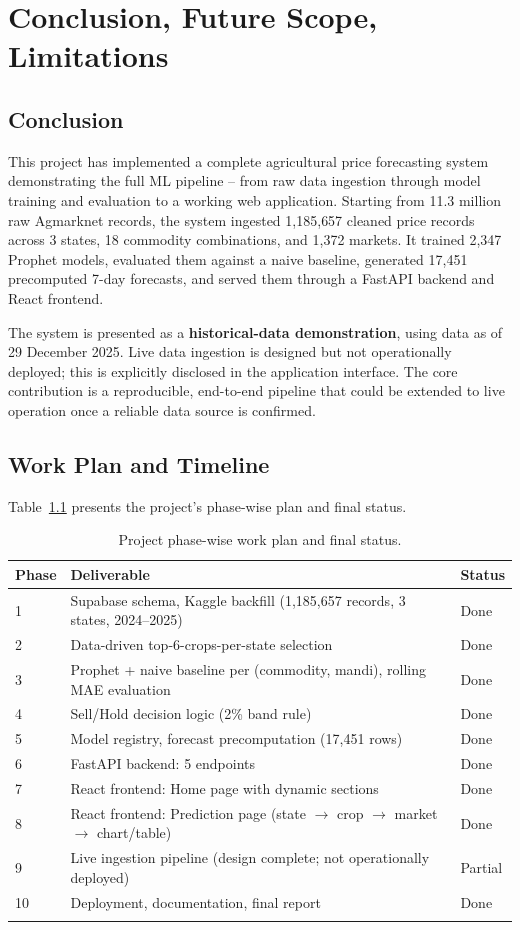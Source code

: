 \chapter{Conclusion, Future Scope, Limitations}

\section{Conclusion}
This project has implemented a complete agricultural price forecasting
system demonstrating the full ML pipeline -- from raw data ingestion
through model training and evaluation to a working web application.
Starting from 11.3 million raw Agmarknet records, the system ingested
1{,}185{,}657 cleaned price records across 3 states, 18 commodity
combinations, and 1{,}372 markets. It trained 2{,}347 Prophet models,
evaluated them against a naive baseline, generated 17{,}451 precomputed
7-day forecasts, and served them through a FastAPI backend and React
frontend.

The system is presented as a \textbf{historical-data demonstration},
using data as of 29 December 2025. Live data ingestion is designed but
not operationally deployed; this is explicitly disclosed in the
application interface. The core contribution is a reproducible,
end-to-end pipeline that could be extended to live operation once a
reliable data source is confirmed.

\section{Work Plan and Timeline}
Table~\ref{tab:timeline} presents the project's phase-wise plan and
final status.

\begin{longtable}{@{}p{1.2cm}p{7.5cm}p{3cm}@{}}
\toprule
\textbf{Phase} & \textbf{Deliverable} & \textbf{Status} \\
\midrule
\endhead
1 & Supabase schema, Kaggle backfill (1{,}185{,}657 records, 3 states, 2024--2025) & Done \\
2 & Data-driven top-6-crops-per-state selection & Done \\
3 & Prophet + naive baseline per (commodity, mandi), rolling MAE evaluation & Done \\
4 & Sell/Hold decision logic (2\% band rule) & Done \\
5 & Model registry, forecast precomputation (17{,}451 rows) & Done \\
6 & FastAPI backend: 5 endpoints & Done \\
7 & React frontend: Home page with dynamic sections & Done \\
8 & React frontend: Prediction page (state $\to$ crop $\to$ market $\to$ chart/table) & Done \\
9 & Live ingestion pipeline (design complete; not operationally deployed) & Partial \\
10 & Deployment, documentation, final report & Done \\
\bottomrule
\caption{Project phase-wise work plan and final status.}
\label{tab:timeline}
\end{longtable}

